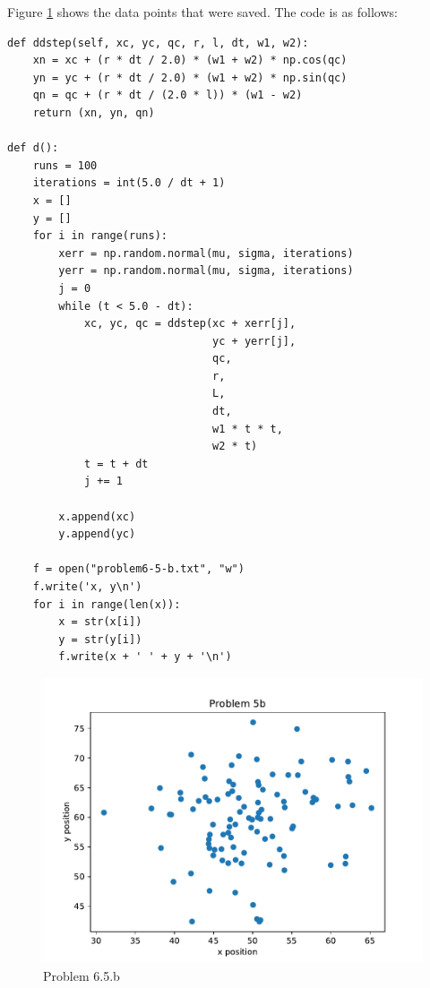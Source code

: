 \documentclass{article}
\begin{document}
\newpage
\noindent Figure \ref{fig:6.5.b} shows the data points that were saved.
The code is as follows:
\begin{verbatim}
def ddstep(self, xc, yc, qc, r, l, dt, w1, w2):
    xn = xc + (r * dt / 2.0) * (w1 + w2) * np.cos(qc)
    yn = yc + (r * dt / 2.0) * (w1 + w2) * np.sin(qc)
    qn = qc + (r * dt / (2.0 * l)) * (w1 - w2)
    return (xn, yn, qn)

def d():
    runs = 100
    iterations = int(5.0 / dt + 1)
    x = []
    y = []
    for i in range(runs):
        xerr = np.random.normal(mu, sigma, iterations)
        yerr = np.random.normal(mu, sigma, iterations)
        j = 0
        while (t < 5.0 - dt):
            xc, yc, qc = ddstep(xc + xerr[j],
                                yc + yerr[j],
                                qc,
                                r,
                                L,
                                dt,
                                w1 * t * t,
                                w2 * t)
            t = t + dt
            j += 1

        x.append(xc)
        y.append(yc)

    f = open("problem6-5-b.txt", "w")
    f.write('x, y\n')
    for i in range(len(x)):
        x = str(x[i])
        y = str(y[i])
        f.write(x + ' ' + y + '\n')

\end{verbatim}

\begin{figure}[h]
    \centering
    \includegraphics[pages=1]{p6-5-b}
    \caption{Problem 6.5.b}
    \label{fig:6.5.b}
\end{figure}
\end{document}
